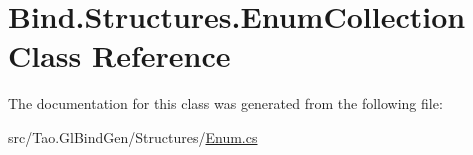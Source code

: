 \hypertarget{class_bind_1_1_structures_1_1_enum_collection}{
\section{Bind.Structures.EnumCollection Class Reference}
\label{class_bind_1_1_structures_1_1_enum_collection}
}


The documentation for this class was generated from the following file:\begin{DoxyCompactItemize}
\item 
src/Tao.GlBindGen/Structures/\hyperlink{_enum_8cs}{Enum.cs}\end{DoxyCompactItemize}
